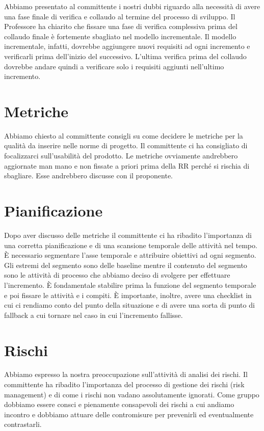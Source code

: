 \documentclass{article}
\begin{document}
Abbiamo presentato al committente i nostri dubbi riguardo alla necessità di avere una fase finale di verifica e collaudo al termine del processo di sviluppo. Il Professore ha chiarito che fissare una fase di verifica complessiva prima del collaudo finale è fortemente sbagliato nel modello incrementale. Il modello incrementale, infatti, dovrebbe aggiungere nuovi requisiti ad ogni incremento e verificarli prima dell'inizio del successivo. L'ultima verifica prima del collaudo dovrebbe andare quindi a verificare solo i requisiti aggiunti nell'ultimo incremento.

\section{Metriche}%
\label{sec:metriche}

Abbiamo chiesto al committente consigli su come decidere le metriche per la qualità da inserire nelle norme di progetto. Il committente ci ha consigliato di focalizzarci sull'usabilità del prodotto. Le metriche ovviamente andrebbero aggiornate man mano e non fissate a priori prima della RR perché si rischia di sbagliare. Esse andrebbero discusse con il proponente.

\section{Pianificazione}%
\label{sec:pianificazione}

Dopo aver discusso delle metriche il committente ci ha ribadito l'importanza di una corretta pianificazione e di una scansione temporale delle attività nel tempo. È necessario segmentare l'asse temporale e attribuire obiettivi ad ogni segmento. Gli estremi del segmento sono delle baseline mentre il contenuto del segmento sono le attività di processo che abbiamo deciso di svolgere per effettuare l'incremento. È fondamentale stabilire prima la funzione del segmento temporale e poi fissare le attività e i compiti. È importante, inoltre, avere una checklist in cui ci rendiamo conto del punto della situazione e di avere una sorta di punto di fallback a cui tornare nel caso in cui l'incremento fallisse.

\section{Rischi}%
\label{sec:rischi}

Abbiamo espresso la nostra preoccupazione sull'attività di analisi dei rischi. Il committente ha ribadito l'importanza del processo di gestione dei rischi (risk management) e di come i rischi non vadano assolutamente ignorati. Come gruppo dobbiamo essere consci e pienamente consapevoli dei rischi a cui andiamo incontro e dobbiamo attuare delle contromisure per prevenirli ed eventualmente contrastarli.
\newpage
\end{document}
